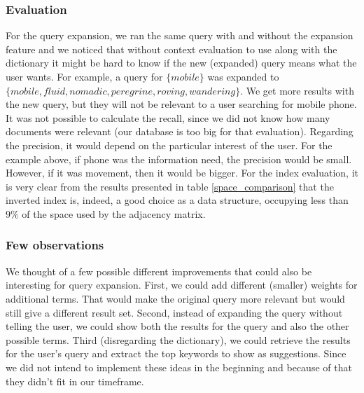 \subsubsection*{Evaluation}
For the query expansion, we ran the same query with and without the expansion feature and we noticed that without context evaluation to use along with the dictionary it might be hard to know if the new (expanded) query means what the user wants. For example, a query for $\{mobile\}$ was expanded to $\{mobile, fluid, nomadic, peregrine, roving, wandering\}$. We get more results with the new query, but they will not be relevant to a user searching for mobile phone. It was not possible to calculate the recall, since we did not know how many documents were relevant (our database is too big for that evaluation). Regarding the precision, it would depend on the particular interest of the user. For the example above, if phone was the information need, the precision would be small. However, if it was movement, then it would be bigger.
For the index evaluation, it is very clear from the results presented in table \ref{space_comparison} that the inverted index is, indeed, a good choice as a data structure, occupying less than $ 9\% $ of the space used by the adjacency matrix.

\subsubsection*{Few observations}
We thought of a few possible different improvements that could also be interesting for query expansion. First, we could add different (smaller) weights for additional terms. That would make the original query more relevant but would still give a different result set. Second, instead of expanding the query without telling the user, we could show both the results for the query and also the other possible terms. Third (disregarding the dictionary), we could retrieve the results for the user’s query and extract the top keywords to show as suggestions. Since we did not intend to implement these ideas in the beginning and because of that they didn't fit in our timeframe.
